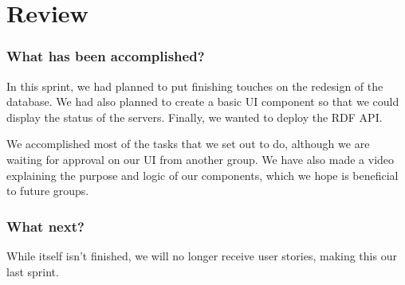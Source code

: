 \section{Review}\label{sec:sprint6review}

\subsubsection*{What has been accomplished?}
In this sprint, we had planned to put finishing touches on the redesign of the database. We had also planned to create a basic UI component so that we could display the status of the servers. Finally, we wanted to deploy the RDF API.

We accomplished most of the tasks that we set out to do, although we are waiting for approval on our UI from another group. We have also made a video explaining the purpose and logic of our components, which we hope is beneficial to future \knox{} groups.

\subsubsection*{What next?}
While \knox{} itself isn't finished, we will no longer receive user stories, making this our last sprint. 